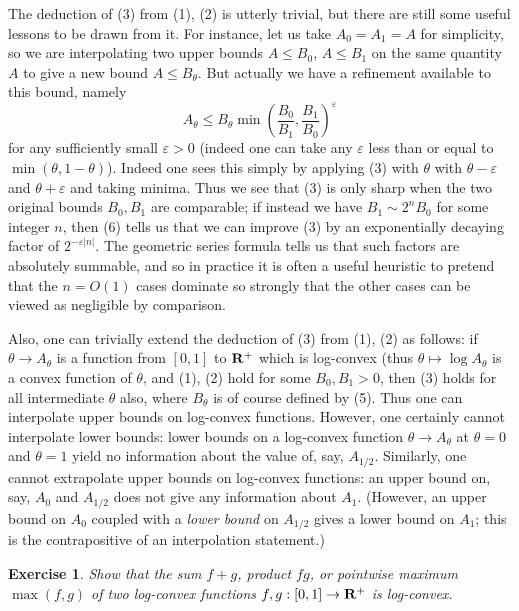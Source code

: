 \documentclass[10pt,reqno]{amsart}
\newtheorem{exercise}[theorem]{Exercise}
\begin{document}
The deduction of (3) from (1), (2) is utterly trivial, but there are still some useful lessons to be drawn from it. For instance, let us take $A_0=A_1=A$ for simplicity, so we are interpolating two upper bounds $A \leq B_0$, $A \leq B_1$ on the same quantity $A$ to give a new bound $A \leq B_\theta$. But actually we have a refinement available to this bound, namely
%
\begin{equation} A_\theta \leq B_\theta \min \left( \frac{B_0}{B_1}, \frac{B_1}{B_0}  \right)^\varepsilon \end{equation}
%
for any sufficiently small $\varepsilon > 0$ (indeed one can take any $\varepsilon$ less than or equal to $\min(\theta,1-\theta)$). Indeed one sees this simply by applying (3) with $\theta$ with $\theta-\varepsilon$ and $\theta+\varepsilon$ and taking minima. Thus we see that (3) is only sharp when the two original bounds $B_0, B_1$ are comparable; if instead we have $B_1 \sim 2^n B_0$ for some integer $n$, then (6) tells us that we can improve (3) by an exponentially decaying factor of $2^{-\varepsilon |n|}$. The geometric series formula tells us that such factors are absolutely summable, and so in practice it is often a useful heuristic to pretend that the $n=O(1)$ cases dominate so strongly that the other cases can be viewed as negligible by comparison.

Also, one can trivially extend the deduction of (3) from (1), (2) as follows: if $\theta \rightarrow A_\theta$ is a function from $[0,1]$ to ${\bf R}^+$ which is log-convex (thus $\theta \mapsto \log A_\theta$ is a convex function of $\theta$, and (1), (2) hold for some $B_0, B_1 > 0$, then (3) holds for all intermediate $\theta$ also, where $B_\theta$ is of course defined by (5). Thus one can interpolate upper bounds on log-convex functions. However, one certainly cannot interpolate lower bounds: lower bounds on a log-convex function $\theta \rightarrow A_\theta$ at $\theta=0$ and $\theta=1$ yield no information about the value of, say, $A_{1/2}$. Similarly, one cannot extrapolate upper bounds on log-convex functions: an upper bound on, say, $A_0$ and $A_{1/2}$ does not give any information about $A_1$. (However, an upper bound on $A_0$ coupled with a \emph{lower bound} on $A_{1/2}$ gives a lower bound on $A_1$; this is the contrapositive of an interpolation statement.)

\begin{exercise}
    Show that the sum $f+g$, product $fg$, or pointwise maximum $\max(f,g)$ of two log-convex functions $f,g: [0,1] \rightarrow {\bf R}^+$ is log-convex. 
\end{exercise}
\end{document}
